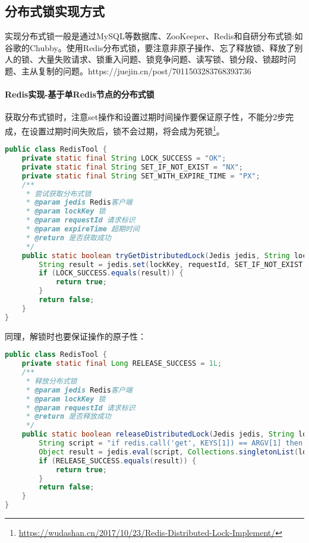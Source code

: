 \documentclass[../../../interview-questions.tex]{subfiles}
\begin{document}
\subsection{分布式锁实现方式}

实现分布式锁一般是通过MySQL等数据库、ZooKeeper、Redis和自研分布式锁:如谷歌的Chubby。使用Redis分布式锁，要注意非原子操作、忘了释放锁、释放了别人的锁、大量失败请求、锁重入问题、锁竞争问题、读写锁、锁分段、锁超时问题、主从复制的问题。https://juejin.cn/post/7011503283768393736

\paragraph{Redis实现-基于单Redis节点的分布式锁}

获取分布式锁时，注意set操作和设置过期时间操作要保证原子性，不能分2步完成，在设置过期时间失败后，锁不会过期，将会成为死锁\footnote{\url{https://wudashan.cn/2017/10/23/Redis-Distributed-Lock-Implement/}}。

\begin{lstlisting}[language=Java]
public class RedisTool {
    private static final String LOCK_SUCCESS = "OK";
    private static final String SET_IF_NOT_EXIST = "NX";
    private static final String SET_WITH_EXPIRE_TIME = "PX";
    /**
     * 尝试获取分布式锁
     * @param jedis Redis客户端
     * @param lockKey 锁
     * @param requestId 请求标识
     * @param expireTime 超期时间
     * @return 是否获取成功
     */
    public static boolean tryGetDistributedLock(Jedis jedis, String lockKey, String requestId, int expireTime) {
        String result = jedis.set(lockKey, requestId, SET_IF_NOT_EXIST, SET_WITH_EXPIRE_TIME, expireTime);
        if (LOCK_SUCCESS.equals(result)) {
            return true;
        }
        return false;
    }
}
\end{lstlisting}

同理，解锁时也要保证操作的原子性：

\begin{lstlisting}[language=Java]
public class RedisTool {
    private static final Long RELEASE_SUCCESS = 1L;
    /**
     * 释放分布式锁
     * @param jedis Redis客户端
     * @param lockKey 锁
     * @param requestId 请求标识
     * @return 是否释放成功
     */
    public static boolean releaseDistributedLock(Jedis jedis, String lockKey, String requestId) {
        String script = "if redis.call('get', KEYS[1]) == ARGV[1] then return redis.call('del', KEYS[1]) else return 0 end";
        Object result = jedis.eval(script, Collections.singletonList(lockKey), Collections.singletonList(requestId));
        if (RELEASE_SUCCESS.equals(result)) {
            return true;
        }
        return false;
    }
}
\end{lstlisting}
\end{document}
